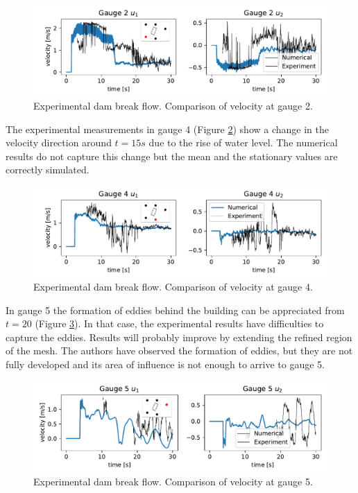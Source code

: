 \documentclass[a4paper,12pt]{elsarticle}
\begin{document}
\begin{figure}
\centering
\includegraphics[width=\textwidth]{img/exp/gauge2_vel.pdf}
\caption{Experimental dam break flow. Comparison of velocity at gauge 2.}
\label{experiment_gauge2_vel}
\end{figure}

The experimental measurements in gauge 4 (Figure \ref{experiment_gauge4_vel}) show a change in the velocity direction around $t=15s$ due to the rise of water level. The numerical results do not capture this change but the mean and the stationary values are correctly simulated.

\begin{figure}
\centering
\includegraphics[width=\textwidth]{img/exp/gauge4_vel.pdf}
\caption{Experimental dam break flow. Comparison of velocity at gauge 4.}
\label{experiment_gauge4_vel}
\end{figure}

In gauge 5 the formation of eddies behind the building can be appreciated from $t=20$ (Figure \ref{experiment_gauge5_vel}). In that case, the experimental results have difficulties to capture the eddies. Results will probably improve by extending the refined region of the mesh. The authors have observed the formation of eddies, but they are not fully developed and its area of influence is not enough to arrive to gauge 5.


\begin{figure}
\centering
\includegraphics[width=\textwidth]{img/exp/gauge5_vel.pdf}
\caption{Experimental dam break flow. Comparison of velocity at gauge 5.}
\label{experiment_gauge5_vel}
\end{figure}
\end{document}
